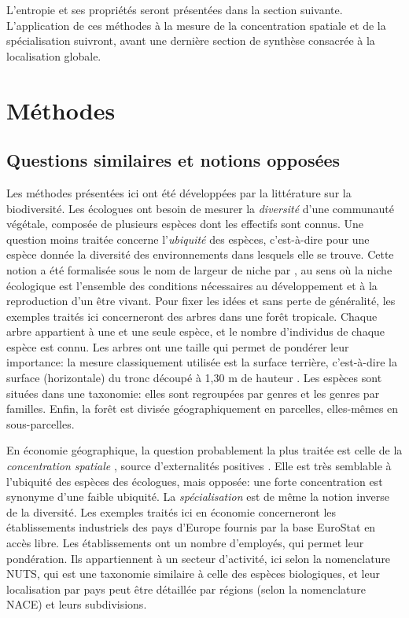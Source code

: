 \documentclass[fleqn,10pt]{ArtEcoFoG} %
\begin{document}
L'entropie et ses propriétés seront présentées dans la section suivante.
L'application de ces méthodes à la mesure de la concentration spatiale
et de la spécialisation suivront, avant une dernière section de synthèse
consacrée à la localisation globale.

\section{Méthodes}\label{methodes}

\subsection{Questions similaires et notions
opposées}\label{questions-similaires-et-notions-opposees}

Les méthodes présentées ici ont été développées par la littérature sur
la biodiversité. Les écologues ont besoin de mesurer la \emph{diversité}
d'une communauté végétale, composée de plusieurs espèces dont les
effectifs sont connus. Une question moins traitée concerne
l'\emph{ubiquité} des espèces, c'est-à-dire pour une espèce donnée la
diversité des environnements dans lesquels elle se trouve. Cette notion
a été formalisée sous le nom de largeur de niche par \citet{Levins1968},
au sens où la niche écologique est l'ensemble des conditions nécessaires
au développement et à la reproduction d'un être vivant. Pour fixer les
idées et sans perte de généralité, les exemples traités ici concerneront
des arbres dans une forêt tropicale. Chaque arbre appartient à une et
une seule espèce, et le nombre d'individus de chaque espèce est connu.
Les arbres ont une taille qui permet de pondérer leur importance: la
mesure classiquement utilisée est la surface terrière, c'est-à-dire la
surface (horizontale) du tronc découpé à 1,30 m de hauteur
\citep{Husch2016}. Les espèces sont situées dans une taxonomie: elles
sont regroupées par genres et les genres par familles. Enfin, la forêt
est divisée géographiquement en parcelles, elles-mêmes en
sous-parcelles.

En économie géographique, la question probablement la plus traitée est
celle de la \emph{concentration spatiale}
\citep{Ottaviano1998, Combes2015}, source d'externalités positives
\citep{Baldwin2004}. Elle est très semblable à l'ubiquité des espèces
des écologues, mais opposée: une forte concentration est synonyme d'une
faible ubiquité. La \emph{spécialisation} \citep{Amiti1997} est de même
la notion inverse de la diversité. Les exemples traités ici en économie
concerneront les établissements industriels des pays d'Europe fournis
par la base EuroStat en accès libre. Les établissements ont un nombre
d'employés, qui permet leur pondération. Ils appartiennent à un secteur
d'activité, ici selon la nomenclature NUTS, qui est une taxonomie
similaire à celle des espèces biologiques, et leur localisation par pays
peut être détaillée par régions (selon la nomenclature NACE) et leurs
subdivisions.
\end{document}
